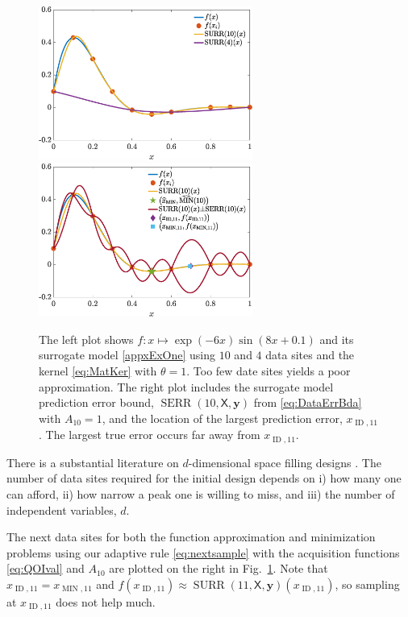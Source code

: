 \documentclass[11pt]{NSFamsart}
\DeclareMathOperator{\SURR}{SURR}
\DeclareMathOperator{\MIN}{MIN}
\DeclareMathOperator{\ID}{ID}
\DeclareMathOperator{\SURRERR}{SERR}
\newcommand{\mX}{\mathsf{X}}
\newcommand{\by}{{\boldsymbol{y}}}
\begin{document}
\begin{figure}
    \centering
    \includegraphics[width = 7cm]{ProgramsImages/fandDataAndAppxSmall.eps} \qquad \qquad
    \includegraphics[width = 7cm]{ProgramsImages/fandDataAndAppxAndRMSPEAndMin.eps}
    \caption{The left plot shows $f: x \mapsto \exp(-6x) \sin(8x+0.1)$ and its surrogate model \eqref{appxExOne} using $10$ and $4$ data sites and the kernel \eqref{eq:MatKer} with $\theta = 1$. Too few date sites yields a poor approximation.  The right plot includes the surrogate model prediction error bound, $\SURRERR(10,\mX,\by)$ from \eqref{eq:DataErrBda} with $A_{10} =1$, and the location of the largest prediction error, $x_{\ID,11}$. The largest true error occurs far away from $x_{\ID,11}$.}
    \label{fig:sampleFun}
\end{figure}

There is a substantial literature on $d$-dimensional space filling designs \cite{FangEtal19a, Jos16a, SanWilNot03}. The number of data sites required for the initial design depends on i) how many one can afford, ii) how narrow a peak one is willing to miss, and iii) the number of independent variables, $d$.

The next data sites for both the function approximation and minimization problems using our adaptive rule \eqref{eq:nextsample} with the acquisition functions \eqref{eq:QOIval} and $A_{10}$ are plotted on the right in Fig.\ \ref{fig:sampleFun}.  Note that $x_{\ID, 11} = x_{\MIN, 11}$ and $f(x_{\ID, 11}) \approx \SURR(11,\mX,\by)(x_{\ID, 11})$, so  sampling at $x_{\ID, 11}$ does not help much.  
\end{document}
